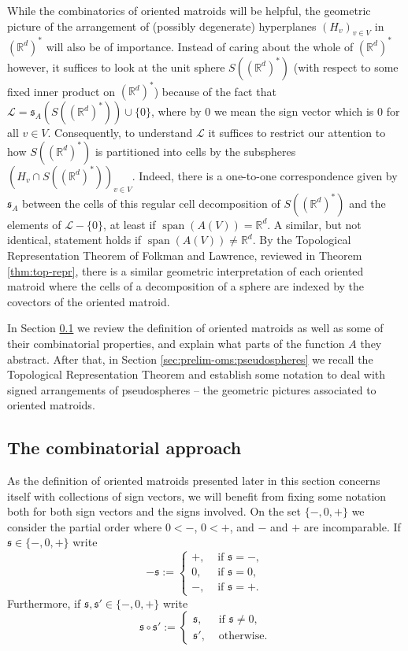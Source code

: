 \documentclass[a4paper,11pt,reqno, english]{amsart}
\theoremstyle{definition}
\theoremstyle{remark}
\newcommand\R{\mathbb R}
\begin{document}
While the combinatorics of oriented matroids will be helpful, the geometric picture of the arrangement of (possibly degenerate) hyperplanes $(H_v)_{v\in V}$ in $(\R^d)^*$ will also be of importance. Instead of caring about the whole of $(\R^d)^*$ however, it suffices to look at the unit sphere $S((\R^d)^*)$ (with respect to some fixed inner product on $(\R^d)^*$) because of the fact that $\mathscr{L}=\mathfrak{s}_A(S((\R^d)^*))\cup\{0\}$, where by $0$ we mean the sign vector which is $0$ for all $v\in V$. Consequently, to understand $\mathscr{L}$ it suffices to restrict our attention to how $S((\R^d)^*)$ is partitioned into cells by the subspheres $(H_v\cap S((\R^d)^*))_{v\in V}$. Indeed, there is a one-to-one correspondence given by $\mathfrak{s}_A$ between the cells of this regular cell decomposition of $S((\R^d)^*)$ and the elements of $\mathscr{L}-\{0\}$, at least if $\operatorname{span}(A(V))=\R^d$. A similar, but not identical, statement holds if $\operatorname{span}(A(V))\neq\R^d$. By the Topological Representation Theorem of Folkman and Lawrence, reviewed in Theorem \ref{thm:top-repr}, there is a similar geometric interpretation of each oriented matroid where the cells of a decomposition of a sphere are indexed by the covectors of the oriented matroid.

In Section \ref{sec:prelim-oms:combinatorial} we review the definition of oriented matroids as well as some of their combinatorial properties, and explain what parts of the function $A$ they abstract. After that, in Section \ref{sec:prelim-oms:pseudospheres} we recall the Topological Representation Theorem and establish some notation to deal with signed arrangements of pseudospheres -- the geometric pictures associated to oriented matroids.

\medskip
\subsection{The combinatorial approach}\label{sec:prelim-oms:combinatorial}
\medskip

As the definition of oriented matroids presented later in this section concerns itself with collections of sign vectors, we will benefit from fixing some notation both for both sign vectors and the signs involved. On the set $\{-,0,+\}$ we consider the partial order where $0<-$, $0<+$, and $-$ and $+$ are incomparable. If $\mathfrak{s}\in\{-,0,+\}$ write
\[
    -\mathfrak{s}:=\begin{cases}
        +, & \text{~if~} \mathfrak{s}=-,\\
        0, & \text{~if~} \mathfrak{s}=0,\\
        -, & \text{~if~} \mathfrak{s}=+.
    \end{cases}
\]
Furthermore, if $\mathfrak{s},\mathfrak{s}'\in\{-,0,+\}$ write
\[
    \mathfrak{s}\circ\mathfrak{s}':=\begin{cases}
        \mathfrak{s}, & \text{~if~} \mathfrak{s}\neq 0,\\
        \mathfrak{s}', & \text{~otherwise.}
    \end{cases}
\]
\end{document}
